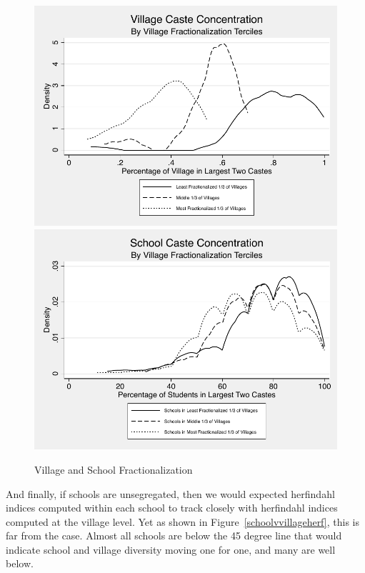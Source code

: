 \documentclass[12pt]{article}
\begin{document}
\begin{figure}[H]
	\begin{center}
		\caption{Village and School Fractionalization}\label{toptwo}
		\includegraphics[scale=.6]{graphs/village_toptwo.pdf}\includegraphics[scale=0.6]{graphs/school_toptwo.pdf}
	\end{center}
\end{figure}

And finally, if schools are unsegregated, then we would expected herfindahl indices computed within each school to track closely with herfindahl indices computed at the village level. Yet as shown in Figure~\ref{schoolvvillageherf}, this is far from the case. Almost all schools are below the 45 degree line that would indicate school and village diversity moving one for one, and many are well below.
\end{document}
